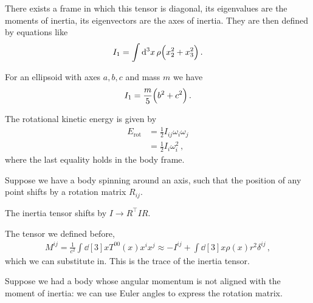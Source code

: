 \documentclass[main.tex]{subfiles}
\begin{document}
There exists a frame in which this tensor is diagonal, its eigenvalues are the moments of inertia, its eigenvectors are the axes of inertia.
They are then defined by equations like 
%
\begin{align}
I_1 = \int \dd[3]{x} \rho \qty(x_2^2 + x_3^2) 
\,.
\end{align}
 
For an ellipsoid with axes \(a, b, c\) and mass \(m\) we have 
%
\begin{align}
I_1 = \frac{m}{5} \qty(b^2 +c^2)
\,.
\end{align}

The rotational kinetic energy is given by 
%
\begin{subequations}
\begin{align}
E _{\text{rot}} &= \frac{1}{2} I_{ij} \omega_{i} \omega_{j} \\ 
&= \frac{1}{2} I_i \omega_{i}^2
\,,
\end{align}
\end{subequations}
%
where the last equality holds in the body frame. 

Suppose we have a body spinning around an axis, such that the position of any point shifts by a rotation matrix \(R_{ij}\). 

The inertia tensor shifts by \(I \rightarrow R^{\top} I R\).

The tensor we defined before, 
%
\begin{align}
M^{ij} = \frac{1}{c^2} \int \dd[3]{x} T^{00} (x) x^{i} x^{j} 
\approx - I^{ij} + \int \dd[3]{x} \rho (x) r^2 \delta^{ij}
\,,
\end{align}
%
which we can substitute in. This is the trace of the inertia tensor. 

Suppose we had a body whose angular momentum is not aligned with the moment of inertia: we can use Euler angles to express the rotation matrix.
\end{document}

